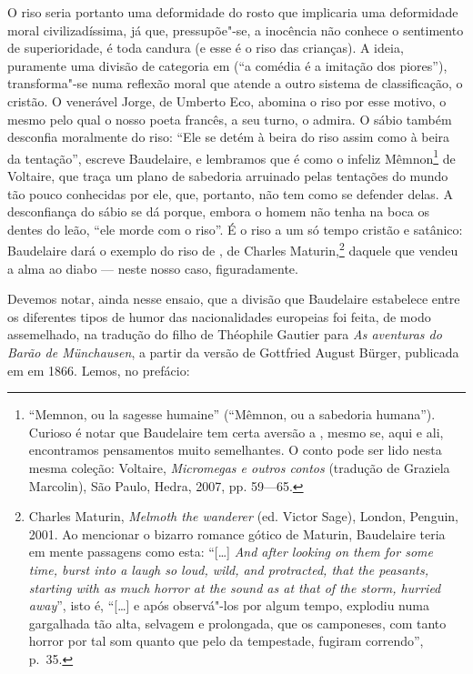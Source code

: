 O riso seria portanto uma deformidade do rosto que implicaria uma
deformidade moral civilizadíssima, já que, pressupõe"-se, a inocência
não conhece o sentimento de superioridade, é toda candura (e esse é o
riso das crianças). A ideia, puramente uma divisão de categoria em
 (“a comédia é a imitação dos piores”), transforma"-se numa
reflexão moral que atende a outro sistema de classificação, o cristão.
O venerável Jorge, de Umberto Eco, abomina o riso por esse motivo, o mesmo pelo
qual o nosso poeta francês, a seu turno, o admira. O sábio também
desconfia moralmente do riso: “Ele se detém à beira do riso assim como
à beira da tentação”, escreve Baudelaire, e lembramos que é como o
infeliz Mêmnon\footnote{ “Memnon, ou la sagesse humaine” (``Mêmnon, ou a
sabedoria humana''). Curioso é notar que Baudelaire tem certa aversão a
, mesmo se, aqui e ali, encontramos pensamentos muito
semelhantes. O conto pode ser lido nesta mesma
coleção: Voltaire, \textit{Micromegas e outros contos} (tradução de
Graziela Marcolin), São Paulo, Hedra, 2007, pp. 59---65.} de Voltaire,
que traça um plano de sabedoria arruinado pelas tentações do mundo tão
pouco conhecidas por ele, que, portanto, não tem como se defender
delas. A desconfiança do sábio se dá porque, embora o homem não tenha
na boca os dentes do leão, “ele morde com o riso”. É o riso a um só
tempo cristão e satânico: Baudelaire dará o exemplo do riso de ,
de Charles Maturin,\footnote{ Charles Maturin, \textit{Melmoth the 		
wanderer} (ed. Victor Sage), London, Penguin, 2001. Ao mencionar o
bizarro romance gótico de Maturin, Baudelaire teria em mente passagens
como esta: ``[\ldots] \textit{And after looking on them for some time, burst into
a laugh so loud, wild, and protracted, that the peasants, starting with
as much horror at the sound as at that of the storm, hurried away}'', isto é,  “[\ldots] e
após observá"-los por algum tempo, explodiu numa gargalhada tão alta,
selvagem e prolongada, que os camponeses, com tanto horror por tal som
quanto que pelo da tempestade, fugiram correndo”, p.~35.} daquele que
vendeu a alma ao diabo --- neste nosso caso, figuradamente.

Devemos notar, ainda nesse ensaio, que a divisão que Baudelaire
estabelece entre os diferentes tipos de humor das nacionalidades
europeias foi feita, de modo assemelhado, na tradução do filho de
Théophile Gautier para \textit{As aventuras do Barão de Münchausen}, a
partir da versão de Gottfried August Bürger, publicada em  em			
1866. Lemos, no prefácio:

